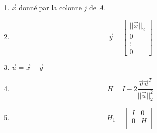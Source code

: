 \begin{enumerate}
    \item $\vec{x}$ donné par la colonne $j$ de $A$.
    \item $$\vec{y} = \begin{bmatrix}
        ||\vec{x}||_2 \\
        0 \\
        \vdots \\
        0
    \end{bmatrix}
    $$
    \item $\vec{u} = \vec{x} - \vec{y}$
    \item $$H= I - 2 \frac{\vec{u}\vec{u}^T}{||\vec{u}||_2^2}$$
    \item $$H_1 = \begin{bmatrix}
        I  & 0 \\
        0  & H \\
    \end{bmatrix}
    $$
    
\end{enumerate}